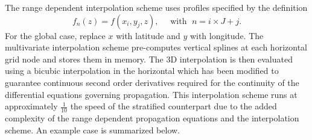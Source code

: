 \documentclass[10pt]{article}
\begin{document}
\hspace{0.25in} The range dependent interpolation scheme uses profiles specified by the definition
\begin{equation*}
 f_n \left( z \right) = f \left( x_i, y_j, z \right), \quad \text{ with } \; n = i \times J + j.
 \end{equation*}
For the global case, replace \(x\) with latitude and \(y\) with longitude.  The multivariate interpolation scheme pre-computes vertical splines at each horizontal grid node and stores them in memory.  The 3D interpolation is then evaluated using a bicubic interpolation in the horizontal which has been modified to guarantee continuous second order derivatives required for the continuity of the differential equations governing propagation.  This interpolation scheme runs at approximately \(\frac{1}{10}\) the speed of the stratified counterpart due to the added complexity of the range dependent propagation equations and the interpolation scheme.  An example case is summarized below.
\end{document}
